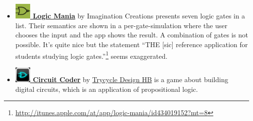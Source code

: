 \begin{itemize}
\item
\href{http://itunes.apple.com/at/app/logic-mania/id434019152?mt=8}{\bf 
\includegraphics[width=0.8cm]{related/LogicMania.png} Logic Mania} 
by 
{Imagination Creations} presents seven logic gates in a list. 
Their semantics are shown in a per-gate-simulation where the user chooses the input and the app shows the result. 
A combination of gates is not possible. It's quite nice but the statement “THE [sic] reference application for students 
studying logic gates.”\footnote{
\url{http://itunes.apple.com/at/app/logic-mania/id434019152?mt=8}}
seems exaggerated.

\item
\href{http://itunes.apple.com/at/app/circuit-coder/id492180472?mt=8}{\bf 
\includegraphics[width=0.8cm]{related/CircuitCoder.png} Circuit Coder} 
by 
\href{http://sweyla.com/}{Trycycle Design HB} is a game about building digital circuits,
which is an application of propositional logic.

\end{itemize}
